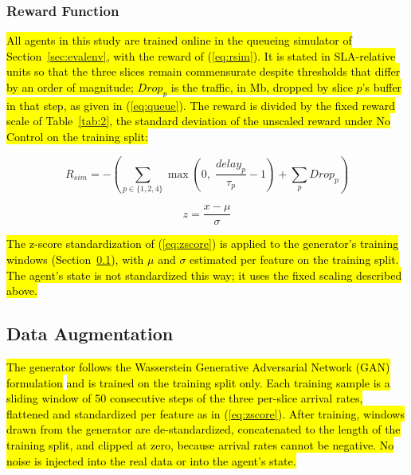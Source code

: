 \documentclass[conference]{IEEEtran}
\newcommand{\rev}[1]{\hl{#1}}
\newcommand{\m}[1]{\mbox{$#1$}}
\begin{document}
\subsubsection{Reward Function}

\rev{All agents in this study are trained online in the queueing simulator of Section~\ref{sec:evalenv}, with the reward of (\ref{eq:rsim}). It is stated in SLA-relative units so that the three slices remain commensurate despite thresholds that differ by an order of magnitude; \m{Drop_p} is the traffic, in Mb, dropped by slice \m{p}'s buffer in that step, as given in (\ref{eq:queue}). The reward is divided by the fixed reward scale of Table~\ref{tab:2}, the standard deviation of the unscaled reward under No Control on the training split:}

\begin{equation}\label{eq:rsim}
R_{sim} = -\left( \sum_{p \in \{1,2,4\}} \max\left(0,\; \frac{delay_p}{\tau_p} - 1 \right) + \sum_{p} Drop_p \right)
\end{equation}

\begin{equation}\label{eq:zscore}
z = \frac{x - \mu}{\sigma}
\end{equation}

\rev{The z-score standardization of (\ref{eq:zscore}) is applied to the generator's training windows (Section~\ref{sec:aug}), with \m{\mu} and \m{\sigma} estimated per feature on the training split. The agent's state is not standardized this way; it uses the fixed scaling described above.}

\subsection{Data Augmentation}\label{sec:aug}

\rev{The generator follows the Wasserstein Generative Adversarial Network (GAN) formulation}\cite{b38}\rev{ and is trained on the training split only. Each training sample is a sliding window of 50 consecutive steps of the three per-slice arrival rates, flattened and standardized per feature as in (\ref{eq:zscore}). After training, windows drawn from the generator are de-standardized, concatenated to the length of the training split, and clipped at zero, because arrival rates cannot be negative. No noise is injected into the real data or into the agent's state.}
\end{document}
